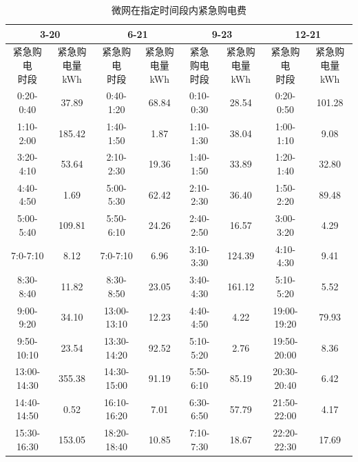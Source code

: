 \documentclass{cumcm2026}
\begin{document}
\begin{table}[htbp]
\centering
\caption{微网在指定时间段内紧急购电费}
\small
\setlength{\tabcolsep}{1pt}
\renewcommand{\arraystretch}{0.90}
\setlength{\extrarowheight}{0.3pt}
\setlength{\aboverulesep}{0.20ex}
\setlength{\belowrulesep}{0.14ex}
\begin{tabular}{@{}c c c c c c c c@{}}
\toprule
\multicolumn{2}{c}{\textbf{3-20}} & \multicolumn{2}{c}{\textbf{6-21}} & \multicolumn{2}{c}{\textbf{9-23}} & \multicolumn{2}{c}{\textbf{12-21}} \\
\midrule
\shortstack{紧急购电\\时段} & \shortstack{紧急购电量\\kWh} & \shortstack{紧急购电\\时段} & \shortstack{紧急购电量\\kWh} & \shortstack{紧急购电\\时段} & \shortstack{紧急购电量\\kWh} & \shortstack{紧急购电\\时段} & \shortstack{紧急购电量\\kWh} \\
0:20-0:40 & 37.89 & 0:40-1:20 & 68.84 & 0:10-0:30 & 28.54 & 0:20-0:50 & 101.28 \\
1:10-2:00 & 185.42 & 1:40-1:50 & 1.87 & 1:10-1:30 & 38.04 & 1:00-1:10 & 9.08 \\
3:20-4:10 & 53.64 & 2:10-2:30 & 19.36 & 1:40-1:50 & 33.89 & 1:20-1:40 & 32.80 \\
4:40-4:50 & 1.69 & 5:00-5:30 & 62.42 & 2:10-2:30 & 36.40 & 1:50-2:20 & 89.48 \\
5:00-5:40 & 109.81 & 5:50-6:10 & 24.26 & 2:40-2:50 & 16.57 & 3:00-3:20 & 4.29 \\
7:0-7:10 & 8.12 & 7:0-7:10 & 6.96 & 3:10-3:30 & 124.39 & 4:10-4:30 & 9.41 \\
8:30-8:40 & 11.82 & 8:30-8:50 & 23.05 & 3:40-4:30 & 161.12 & 5:10-5:20 & 5.52 \\
9:00-9:20 & 34.10 & 13:00-13:10 & 12.23 & 4:40-4:50 & 4.22 & 19:00-19:20 & 79.93 \\
9:50-10:10 & 23.54 & 13:30-14:20 & 92.52 & 5:10-5:20 & 2.76 & 19:50-20:00 & 8.36 \\
13:00-14:30 & 355.38 & 14:30-15:00 & 91.19 & 5:50-6:10 & 85.19 & 20:30-20:40 & 6.42 \\
14:40-14:50 & 0.52 & 16:10-16:20 & 7.01 & 6:30-6:50 & 57.79 & 21:50-22:00 & 4.17 \\
15:30-16:30 & 153.05 & 18:20-18:40 & 10.85 & 7:10-7:30 & 18.67 & 22:20-22:30 & 17.69 \\

\end{tabular}
\end{table}
\end{document}
